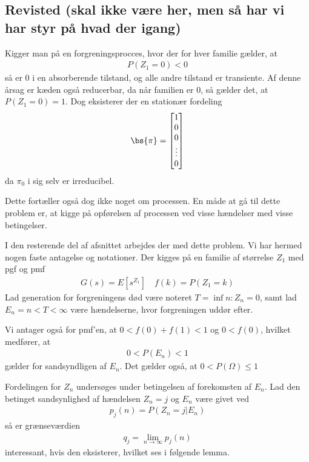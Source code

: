 \subsection{Revisted (skal ikke være her, men så har vi har styr på hvad der igang)}

Kigger man på en forgreningsprocces, hvor der for hver familie gælder, at   
\begin{align*}
P(Z_1=0)<0    
\end{align*}
så er $0$ i en absorberende tilstand, og alle andre tilstand er transiente. Af denne årsag er kæden også reducerbar, da når familien er $0$, så gælder det, at $P(Z_1=0)=1$. Dog eksisterer der en stationær fordeling 
\begin{align*}
    \bs{\pi}=\begin{bmatrix}
1\\
0\\
0\\
\vdots\\
0
\end{bmatrix}
\end{align*}
da $\pi_0$ i sig selv er irreducibel.  

Dette fortæller også dog ikke noget om processen. En måde at gå til dette problem er, at kigge på opførelsen af processen ved visse hændelser med visse betingelser. 

I den resterende del af afsnittet arbejdes der med dette problem. Vi har hermed nogen faste antagelse og notationer. Der kigges på en familie af størrelse $Z_1$ med pgf og pmf 
\begin{align*}
    G(s)=E[s^{Z_1}] \quad f(k)=P(Z_1=k)
\end{align*} 
Lad generation for forgreningens død være noteret $T=\inf{n:Z_n=0}$, samt  
lad $E_n={n<T<\infty}$
være hændelserne, hvor forgreningen uddør efter. 

Vi antager også for pmf'en, at $0<f(0)+f(1)<1$ og $0<f(0)$, hvilket medfører, at 
\begin{align*}
    0<P(E_n)<1    
\end{align*}
gælder for sandsyndligen af $E_n$. Det gælder også, at $0< P(\Omega)\leq 1$

Fordelingen for $Z_n$ undersøges under betingelsen af forekomsten af $E_n$. Lad den betinget sandsynlighed af hændelsen $Z_n=j$ og $E_n$ være givet ved 
\begin{align*}
    p_j(n)=P(Z_n=j | E_n)
\end{align*}
så er grænseværdien 
\begin{align*}
q_j=\lim_{n\to \infty} p_j(n)    
\end{align*}
interessant, hvis den eksisterer, hvilket ses i følgende lemma. 

